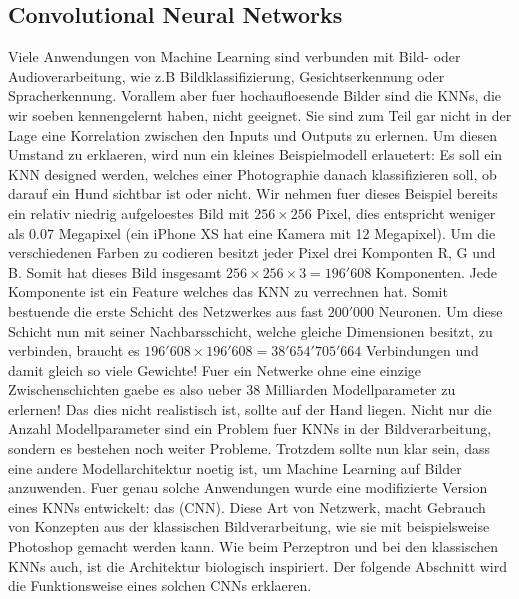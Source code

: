 \documentclass[../main]{subfiles}
\begin{document}
\subsection{Convolutional Neural Networks}
Viele Anwendungen von Machine Learning sind verbunden mit Bild- oder
Audioverarbeitung, wie z.B Bildklassifizierung, Gesichtserkennung oder
Spracherkennung.
Vorallem aber fuer hochaufloesende Bilder sind die KNNs, die wir soeben
kennengelernt haben, nicht geeignet. Sie sind zum Teil gar nicht in der
Lage eine Korrelation zwischen den Inputs und Outputs zu erlernen.
Um diesen Umstand zu erklaeren, wird nun ein kleines Beispielmodell erlauetert:
\para{}
Es soll ein KNN designed werden, welches einer Photographie danach klassifizieren
soll, ob darauf ein Hund sichtbar ist oder nicht. Wir nehmen fuer dieses
Beispiel bereits ein relativ niedrig aufgeloestes Bild mit $256 \times 256$
Pixel, dies entspricht weniger als $0.07$ Megapixel (ein iPhone XS hat eine Kamera mit
12 Megapixel). Um die verschiedenen Farben zu codieren besitzt jeder Pixel drei Komponten R, G
und B. Somit hat dieses Bild insgesamt $256 \times 256 \times 3 = 196'608$
Komponenten. Jede Komponente ist ein Feature welches das KNN zu verrechnen hat. Somit bestuende
die erste Schicht des Netzwerkes aus fast $200'000$ Neuronen. Um diese Schicht
nun mit seiner Nachbarsschicht, welche gleiche Dimensionen besitzt, zu verbinden, braucht
es $196'608 \times 196'608 = 38'654'705'664$ Verbindungen und damit gleich so
viele Gewichte! Fuer ein Netwerke ohne eine einzige Zwischenschichten gaebe es
also ueber 38 Milliarden Modellparameter zu erlernen! Das dies nicht realistisch ist,
sollte auf der Hand liegen.
\para{}
Nicht nur die Anzahl Modellparameter sind ein Problem fuer KNNs in der
Bildverarbeitung, sondern es bestehen noch weiter Probleme.
Trotzdem sollte nun klar sein, dass eine andere Modellarchitektur noetig ist, um Machine
Learning auf Bilder anzuwenden. Fuer genau solche Anwendungen wurde eine modifizierte
Version eines KNNs entwickelt: das  (CNN).
Diese Art von Netzwerk, macht Gebrauch von Konzepten aus der klassischen
Bildverarbeitung, wie sie mit beispielsweise Photoshop gemacht werden kann.
Wie beim Perzeptron und bei den klassischen KNNs auch, ist die Architektur
biologisch inspiriert.
Der folgende Abschnitt wird die Funktionsweise eines solchen CNNs erklaeren.
\para{}
\cite{deeplearning.ai:cnn}
\cite{wiki:cnn}
\end{document}
